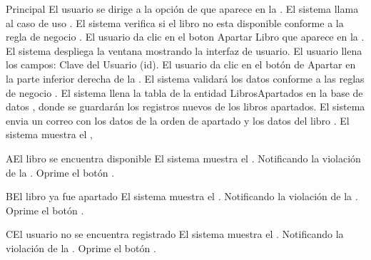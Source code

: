 	\begin{UCtrayectoria}{Principal}
		\UCpaso[\UCactor] El usuario se dirige a la opción de  que aparece en la .
		\UCpaso[\UCsist] El sistema llama al caso de uso .
		\UCpaso[\UCsist] El sistema verifica si el libro no esta disponible conforme a la regla de negocio .
		\UCpaso[\UCactor] El usuario da clic en el boton Apartar Libro que aparece en la .
		\UCpaso[\UCsist] El sistema despliega la ventana  mostrando la interfaz de usuario.
		\UCpaso[\UCactor] El usuario llena los campos: Clave del Usuario (id).
		\UCpaso[\UCactor] El usuario da clic en el botón de Apartar en la parte inferior derecha de la .
		\UCpaso[\UCsist] El sistema validará los datos conforme a las reglas de negocio .
		\UCpaso[\UCsist] El sistema llena la tabla de la entidad LibrosApartados en la base de datos , donde se guardarán los registros nuevos de los libros apartados. 
		\UCpaso[\UCsist] El sistema envia un correo con los datos de la orden de apartado y los datos del libro .		
		\UCpaso[\UCsist] El sistema muestra el ,
	\end{UCtrayectoria}
		\begin{UCtrayectoriaA}{A}{El libro se encuentra disponible}
			\UCpaso[\UCsist] El sistema muestra el . Notificando la violación de la .
			\UCpaso[\UCactor] Oprime el botón .
		\end{UCtrayectoriaA}		
		\begin{UCtrayectoriaA}{B}{El libro ya fue apartado}
			\UCpaso[\UCsist] El sistema muestra el . Notificando la violación de la .
			\UCpaso[\UCactor] Oprime el botón .
		\end{UCtrayectoriaA}
		
		\begin{UCtrayectoriaA}{C}{El usuario no se encuentra registrado}
			\UCpaso[\UCsist] El sistema muestra el . Notificando la violación de la .
			\UCpaso[\UCactor] Oprime el botón .
		\end{UCtrayectoriaA}
		
